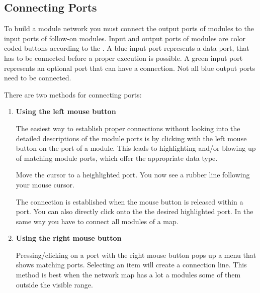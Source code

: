 	


	 \subsection{Connecting Ports}
	 \label{connecting}

	 To build a module network you must connect the output ports of modules to the 
	 input ports of follow-on modules. Input and output ports of modules are 
	 color coded buttons according to the {\myicon}. A blue input 
	 port represents a data port, that has to be connected before a proper 
	 execution is possible. A green input port represents an optional port that can 
	 have a connection. Not all blue output ports need to be connected.  

    There are two methods for connecting ports:
    
    \begin{enumerate}
    \item{\bf Using the left mouse button}
    
	 The easiest way to establish proper connections without looking into 
	 the detailed descriptions of the module ports is by clicking with the left mouse 
	 button on the port of a module. This leads to  highlighting and/or blowing up of matching module ports, which 
    offer the appropriate data type. 
    
    
    Move the cursor to a heighlighted port. You now see a rubber line following 
    your mouse cursor. 
    
    
    The connection is established when the mouse button is released within a port. 
    You can also directly click onto the the desired highlighted port. In the same 
	 way you have to connect all modules of a map.
    


    \item{\bf Using the right mouse button}
    
	 Pressing/clicking on a port with the right mouse button pops up a menu that shows matching ports. 
    Selecting an item will create a connection line. This method is best when the network map has a lot a modules 
    some of them outside the visible range.
    

    \end{enumerate}
    
